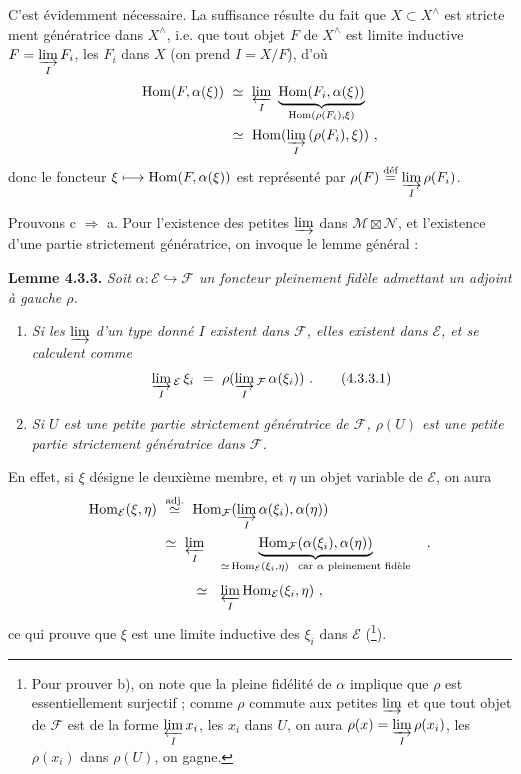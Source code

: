 \noindent C'est évidemment nécessaire. La suffisance résulte du fait que $X\subset X^\wedge$ est stricte%
%
%
ment génératrice dans $X^\wedge$, i.e. que tout objet $F$ de $X^\wedge$ est limite inductive $F=\varinjlim\limits_I F_i$, les $F_i$ dans $X$ (on prend $I=X/F$), d'où
\[
\begin{aligned}
\Hom(F,\alpha(\xi))\ &\simeq\ \varprojlim_I\ \underbrace{\Hom(F_i,\alpha(\xi))}_{\Hom(\rho(F_i),\xi)}\\
&\simeq\ \Hom(\varinjlim_I\,(\rho(F_i),\xi))\ ,
\end{aligned}
\]
donc le foncteur $\xi\longmapsto\mathrm{Hom}(F,\alpha(\xi))$ est représenté par $\rho(F)\overset{\text{déf}}{=}\varinjlim\limits_I\rho(F_i)$.

\noindent Prouvons c $\Longrightarrow$ a. Pour l'existence des petites $\varinjlim$ dans $\mathcal M\boxtimes\mathcal N$, et l'existence d'une partie strictement génératrice, on invoque le lemme général :

\noindent\textbf{Lemme 4.3.3.} \textit{Soit $\alpha:\mathcal E\hookrightarrow\mathcal F$ un foncteur pleinement fidèle admettant un adjoint à gauche $\rho$.}
\begin{enumerate}[label={}]
\item[\textcircled{a}] \textit{Si les $\varinjlim$ d'un type donné $I$ existent dans $\mathcal F$, elles existent dans $\mathcal E$, et se calculent comme}
\[
\varinjlim_I{}_{\mathcal E}\,\xi_i\ =\ \rho(\varinjlim_I{}_{\mathcal F}\,\alpha(\xi_i))\ .
\tag*{(4.3.3.1)}
\]
\item[\textcircled{b}] \textit{Si $U$ est une petite partie strictement génératrice de $\mathcal F$, $\rho(U)$ est une petite partie strictement génératrice dans $\mathcal F$.}
\end{enumerate}

\noindent En effet, si $\xi$ désigne le deuxième membre, et $\eta$ un objet variable de $\mathcal E$, on aura
\[
\begin{aligned}
\Hom_{\mathcal E}(\xi,\eta)\ &\overset{\text{adj.}}{\simeq}\ \Hom_{\mathcal F}(\varinjlim_I\alpha(\xi_i),\alpha(\eta))\\
&\simeq\ \varprojlim_I\quad\underbrace{\Hom_{\mathcal F}(\alpha(\xi_i),\alpha(\eta))}_{\simeq\,\Hom_{\mathcal E}(\xi_i,\eta)\ \ \text{car $\alpha$ pleinement fidèle}}\quad .
\end{aligned}
\]
\[
\simeq\ \ \varprojlim_I\Hom_{\mathcal E}(\xi_i,\eta)\ ,
\]
ce qui prouve que $\xi$ est une limite inductive des $\xi_i$ dans $\mathcal E$ (\footnote{Pour prouver b), on note que la pleine fidélité de $\alpha$ implique que $\rho$ est essentiellement surjectif ; comme $\rho$ commute aux petites $\varinjlim$ et que tout objet de $\mathcal F$ est de la forme $\varprojlim\limits_I x_i$, les $x_i$ dans $U$, on aura $\rho(x)=\varinjlim\limits_I\rho(x_i)$, les $\rho(x_i)$ dans $\rho(U)$, on gagne.}).

